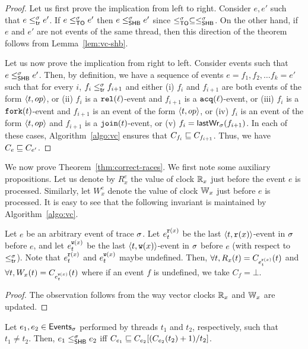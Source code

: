 \begin{proof}
Let us first prove the implication from left to right. Consider $e,e'$
such that $e \leq^{\sigma}_{\mathsf{tr}} e'$. If $e \leq^{\sigma}_{\mathsf{TO}} e'$ then $e \leq^{\sigma}_{\mathsf{SHB}}
e'$ since $\leq^{\sigma}_{\mathsf{TO}} \subseteq \leq^{\sigma}_{\mathsf{SHB}}$. On the other hand, if $e$
and $e'$ are not events of the same thread, then this direction of the
theorem follows from Lemma~\ref{lem:vc-shb}.

Let us now prove the implication from right to left. Consider events
such that $e \leq^{\sigma}_{\mathsf{SHB}} e'$. Then, by definition, we have a sequence of
events $e = f_1,f_2,\ldots f_k = e'$ such that for every $i$,
$f_i \leq^{\sigma}_{\mathsf{tr}} f_{i+1}$ and either (i) $f_i$ and $f_{i+1}$ are both
events of the form $\langle t,op\rangle$, or (ii) $f_i$ is a $\mathtt{rel}(\ell)$-event
and $f_{i+1}$ is a $\mathtt{acq}(\ell)$-event, or (iii) $f_i$ is a
$\mathtt{fork}(t)$-event and $f_{i+1}$ is an event of the form $\langle t,op\rangle$, or
(iv) $f_i$ is an event of the form $\langle t,op\rangle$ and $f_{i+1}$ is a
$\mathtt{join}(t)$-event, or (v) $f_i = \mathsf{lastWr}_{\sigma}(f_{i+1})$. In each of these
cases, Algorithm~\ref{algo:vc} ensures that $C_{f_i} \sqsubseteq
C_{f_{i+1}}$. Thus, we have $C_e \sqsubseteq C_{e'}$.
\end{proof}

We now prove Theorem~\ref{thm:correct-races}.  We first note some
auxiliary propositions.  Let us denote by $R_x^e$ the value of clock
$\mathbb{R}_x$ just before the event $e$ is processed.  Similarly, let
$W_x^e$ denote the value of clock $\mathbb{W}_x$ just before $e$ is
processed. It is easy to see that the following invariant is
maintained by Algorithm~\ref{algo:vc}.

\begin{proposition}
\label{prop:vc-invariantrw}
Let $e$ be an arbitrary event of trace $\sigma$. Let $e_t^{\mathtt{r}(x)}$ 
be the last $\langle t, \mathtt{r}(x)\rangle$-event in $\sigma$ before $e$, 
and let $e_t^{\mathtt{w}(x)}$ be the last
$\langle t, \mathtt{w}(x)\rangle$-event in $\sigma$ before $e$ (with respect to
$\leq^{\sigma}_{\mathsf{tr}}$). 
Note that $e_t^{\mathtt{r}(x)}$  and $e_t^{\mathtt{w}(x)}$  maybe undefined. 
Then, $\forall t, R_x(t) = C_{e_t^{\mathtt{r}(x)}}(t)$ and 
$\forall t, W_x(t) = C_{e_t^{\mathtt{w}(x)}}(t)$ 
where if an event $f$ is undefined, we take $C_f = \bot$.
\end{proposition}

\begin{proof}
The observation follows from the way vector clocks $\mathbb{R}_x$ and
$\mathbb{W}_x$ are updated.
\end{proof}

\begin{lemma}
\label{lem:prev_clock}
Let $e_1, e_2 \in \mathsf{Events}_{\sigma}$ performed by threads $t_1$ and $t_2$,
respectively, such that $t_1 \neq t_2$.  Then, $e_1 \leq^{\sigma}_{\mathsf{SHB}} e_2$ iff
$C_{e_1} \sqsubseteq C_{e_2}[( C_{e_2}(t_2) + 1)/t_2]$.
\end{lemma}


